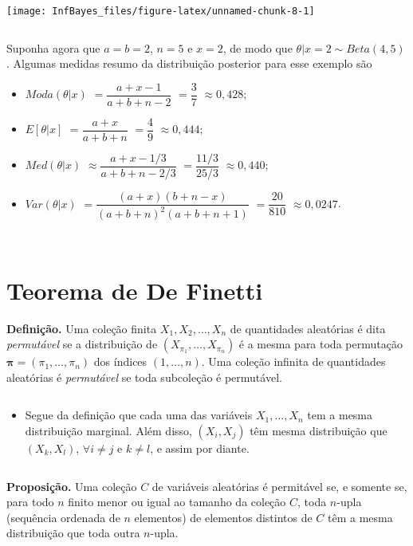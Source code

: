 \documentclass[
]{book}
\providecommand{\tightlist}{%
  \setlength{\itemsep}{0pt}\setlength{\parskip}{0pt}}
\begin{document}
\begin{center}\texttt{[image: InfBayes\_files/figure-latex/unnamed-chunk-8-1]} \end{center}

\(~\)

Suponha agora que \(a=b=2\), \(n=5\) e \(x=2\), de modo que \(\theta|x=2 \sim Beta(4,5)\). Algumas medidas resumo da distribuição posterior para esse exemplo são

\begin{itemize}
\item
  \(Moda(\theta|x)\) \(=\dfrac{a+x-1}{a+b+n-2}\) \(=\dfrac{3}{7}\) \(\approx 0,428\);
\item
  \(E[\theta|x]\) \(=\dfrac{a+x}{a+b+n}\) \(=\dfrac{4}{9}\) \(\approx 0,444\);
\item
  \(Med(\theta|x)\) \(\approx \dfrac{a+x-1/3}{a+b+n-2/3}\) \(=\dfrac{11/3}{25/3}\) \(\approx 0,440\);
\item
  \(Var(\theta|x)\) \(=\dfrac{(a+x)(b+n-x)}{(a+b+n)^2(a+b+n+1)}\) \(=\dfrac{20}{810}\) \(\approx 0,0247\).
\end{itemize}

\(~\)

\(~\)

\hypertarget{teorema-de-de-finetti}{%
\section{Teorema de De Finetti}\label{teorema-de-de-finetti}}

\textbf{Definição.} Uma coleção finita \(X_1,X_2,\ldots,X_n\) de quantidades aleatórias é dita \emph{permutável} se a distribuição de \(\left(X_{\pi_1},\ldots,X_{\pi_n}\right)\) é a mesma para toda permutação \(\boldsymbol\pi=(\pi_1,\ldots,\pi_n)\) dos índices \((1,\ldots,n)\). Uma coleção infinita de quantidades aleatórias é \emph{permutável} se toda subcoleção é permutável.

\(~\)

\begin{itemize}
\tightlist
\item
  Segue da definição que cada uma das variáveis \(X_1,\ldots,X_n\) tem a mesma distribuição marginal. Além disso, \((X_i,X_j)\) têm mesma distribuição que \((X_k,X_l)\), \(\forall i\neq j\) e \(k\neq l\), e assim por diante.
\end{itemize}

\(~\)

\textbf{Proposição.} Uma coleção \(C\) de variáveis aleatórias é permitável se, e somente se, para todo \(n\) finito menor ou igual ao tamanho da coleção \(C\), toda \(n\)-upla (sequência ordenada de \(n\) elementos) de elementos distintos de \(C\) têm a mesma distribuição que toda outra \(n\)-upla.
\end{document}
